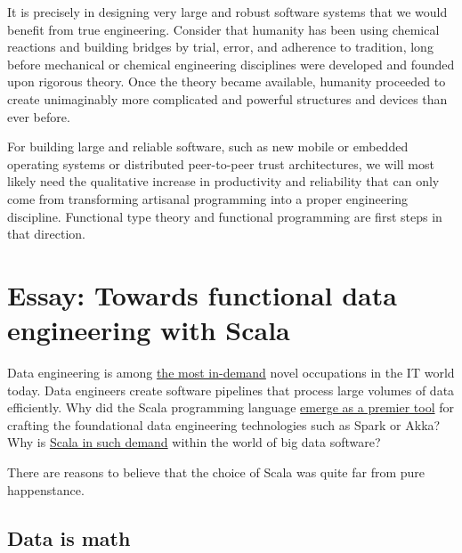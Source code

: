 It is precisely in designing very large and robust software systems
that we would benefit from true engineering. Consider that humanity
has been using chemical reactions and building bridges by trial, error,
and adherence to tradition, long before mechanical or chemical engineering
disciplines were developed and founded upon rigorous theory. Once
the theory became available, humanity proceeded to create unimaginably
more complicated and powerful structures and devices than ever before.

For building large and reliable software, such as new mobile or embedded
operating systems or distributed peer-to-peer trust architectures,
we will most likely need the qualitative increase in productivity
and reliability that can only come from transforming artisanal programming
into a proper engineering discipline. Functional type theory and functional
programming are first steps in that direction.

\chapter{Essay: Towards functional data engineering with Scala}

Data engineering is among \href{https://www.forbes.com/sites/louiscolumbus/2017/05/13/ibm-predicts-demand-for-data-scientists-will-soar-28-by-2020/}{the most in-demand}
novel occupations in the IT world today. Data engineers create software
pipelines that process large volumes of data efficiently. Why did
the Scala programming language \href{https://www.slideshare.net/noootsab/scala-the-unpredicted-lingua-franca-for-data-science}{emerge as a premier tool}
for crafting the foundational data engineering technologies such as
Spark or Akka? Why is \href{https://techcrunch.com/2016/06/14/scala-is-the-new-golden-child/}{Scala in such demand}
within the world of big data software?

There are reasons to believe that the choice of Scala was quite far
from pure happenstance.

\section{Data is math}

